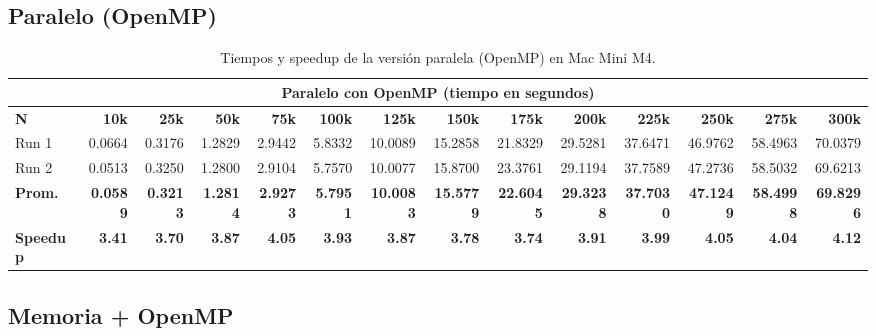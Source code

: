 \documentclass{article}
\begin{document}
\subsection{Paralelo (OpenMP)}

\begin{table}[H]
\centering
\scriptsize
\begin{adjustbox}{max width=\textwidth}
\begin{tabular}{|l|r|r|r|r|r|r|r|r|r|r|r|r|r|}
\hline
\multicolumn{14}{|c|}{\textbf{Paralelo con OpenMP (tiempo en segundos)}} \\
\hline
\textbf{N} & \textbf{10k} & \textbf{25k} & \textbf{50k} & \textbf{75k} & \textbf{100k}
           & \textbf{125k} & \textbf{150k} & \textbf{175k} & \textbf{200k}
           & \textbf{225k} & \textbf{250k} & \textbf{275k} & \textbf{300k} \\
\hline
Run 1
  & 0.0664 & 0.3176 & 1.2829 & 2.9442 & 5.8332
  & 10.0089 & 15.2858 & 21.8329 & 29.5281
  & 37.6471 & 46.9762 & 58.4963 & 70.0379 \\
Run 2
  & 0.0513 & 0.3250 & 1.2800 & 2.9104 & 5.7570
  & 10.0077 & 15.8700 & 23.3761 & 29.1194
  & 37.7589 & 47.2736 & 58.5032 & 69.6213 \\
\hline
\textbf{Prom.}
  & \textbf{0.0589} & \textbf{0.3213} & \textbf{1.2814} & \textbf{2.9273}
  & \textbf{5.7951} & \textbf{10.0083} & \textbf{15.5779} & \textbf{22.6045}
  & \textbf{29.3238} & \textbf{37.7030} & \textbf{47.1249}
  & \textbf{58.4998} & \textbf{69.8296} \\
\hline
\textbf{Speedup}
  & \textbf{3.41} & \textbf{3.70} & \textbf{3.87} & \textbf{4.05}
  & \textbf{3.93} & \textbf{3.87} & \textbf{3.78} & \textbf{3.74}
  & \textbf{3.91} & \textbf{3.99} & \textbf{4.05}
  & \textbf{4.04} & \textbf{4.12} \\
\hline
\end{tabular}
\end{adjustbox}
\caption{Tiempos y speedup de la versi\'on paralela (OpenMP) en Mac Mini M4.}
\label{tab:par}
\end{table}

\subsection{Memoria + OpenMP}
\end{document}
